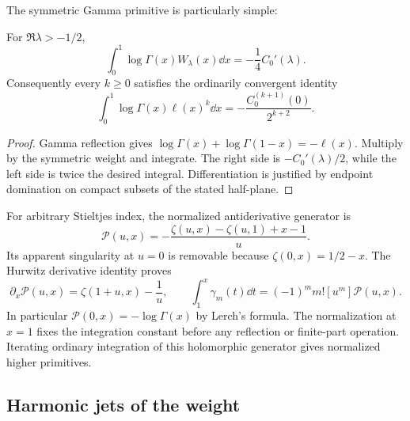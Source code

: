 The symmetric Gamma primitive is particularly simple:
\begin{proposition}\label{beta:gammaprimitive}
For $\Re\lambda>-1/2$,
\begin{equation}\label{beta:gamma}
 \int_0^1\log\Gamma(x)W_\lambda(x)\dd x=-\frac14C_0'(\lambda).
\end{equation}
Consequently every $k\geq0$ satisfies the ordinarily convergent identity
\begin{equation}\label{beta:gammalogs}
 \int_0^1\log\Gamma(x)\ell(x)^k\dd x
 =-\frac{C_0^{(k+1)}(0)}{2^{k+2}}.
\end{equation}
\end{proposition}
\begin{proof}
Gamma reflection gives
$\log\Gamma(x)+\log\Gamma(1-x)=-\ell(x)$. Multiply by the symmetric
weight and integrate. The right side is $-C_0'(\lambda)/2$, while
the left side is twice the desired integral. Differentiation is
justified by endpoint domination on compact subsets of the stated
half-plane.
\end{proof}

For arbitrary Stieltjes index, the normalized antiderivative generator
is
\begin{equation}\label{beta:primitivegenerator}
 \mathcal P(u,x)=-\frac{\zeta(u,x)-\zeta(u,1)+x-1}{u}.
\end{equation}
Its apparent singularity at $u=0$ is removable because
$\zeta(0,x)=1/2-x$. The Hurwitz derivative identity proves
\begin{equation}\label{beta:primitivecoeff}
 \partial_x\mathcal P(u,x)=\zeta(1+u,x)-\frac1u,
 \qquad
 \int_1^x\gamma_m(t)\dd t=(-1)^m m![u^m]\mathcal P(u,x).
\end{equation}
In particular $\mathcal P(0,x)=-\log\Gamma(x)$ by Lerch's formula.
The normalization at $x=1$ fixes the integration constant before any
reflection or finite-part operation. Iterating ordinary integration
of this holomorphic generator gives normalized higher primitives.

\subsection{Harmonic jets of the weight}

